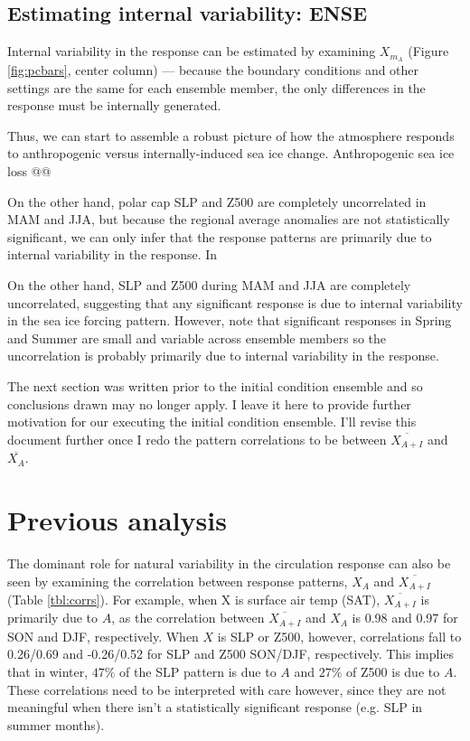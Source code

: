 \documentclass[12pt]{article}
\begin{document}
\subsection{Estimating internal variability: ENSE}

Internal variability in the response can be estimated by examining $X_{m_A}$ (Figure \ref{fig:pcbars}, center column) --- because the boundary conditions and other settings are the same for each ensemble member, the only differences in the response must be internally generated.



Thus, we can start to assemble a robust picture of how the atmosphere responds to anthropogenic versus internally-induced sea ice change. Anthropogenic sea ice loss @@

On the other hand, polar cap SLP and Z500 are completely uncorrelated in MAM and JJA, but because the regional average anomalies are not statistically significant, we can only infer that the response patterns are primarily due to internal variability in the response. In 


On the other hand, SLP and Z500 during MAM and JJA are completely uncorrelated, suggesting that any significant response is due to internal variability in the sea ice forcing pattern. However, note that significant responses in Spring and Summer are small and variable across ensemble members so the uncorrelation is probably primarily due to internal variability in the response.

The next section was written prior to the initial condition ensemble and so conclusions drawn may no longer apply. I leave it here to provide further motivation for our executing the initial condition ensemble. I'll revise this document further once I redo the pattern correlations to be between $\overline{X_{A+I}}$ and $\overline{X_{A}}$.


\section{Previous analysis}

The dominant role for natural variability in the circulation response can also be seen by examining the correlation between response patterns, $X_A$ and $\overline{X_{A+I}}$ (Table \ref{tbl:corrs}). For example, when X is surface air temp (SAT), $\overline{X_{A+I}}$ is primarily due to $A$, as the correlation between $\overline{X_{A+I}}$ and $X_A$ is 0.98 and 0.97 for SON and DJF, respectively. When $X$ is SLP or Z500, however, correlations fall to 0.26/0.69 and -0.26/0.52 for SLP and Z500 SON/DJF, respectively. This implies that in winter, $47\%$ of the SLP pattern is due to $A$ and $27\%$ of Z500 is due to $A$. These correlations need to be interpreted with care however, since they are not meaningful when there isn't a statistically significant response (e.g. SLP in summer months).
\end{document}
